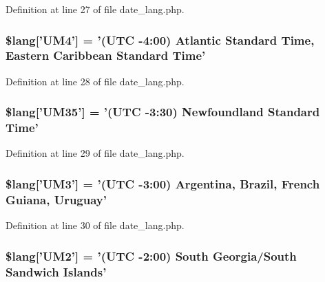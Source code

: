 Definition at line 27 of file date\-\_\-lang.\-php.

\hypertarget{date__lang_8php_a42f66872f4a082bcb2ee004bd2716828}{
\subsubsection[{\$lang}]{\setlength{\rightskip}{0pt plus 5cm}\$lang\mbox{[}'U\-M4'\mbox{]} = '(U\-T\-C -\/4\-:00) Atlantic Standard Time, Eastern Caribbean Standard Time'}}\label{date__lang_8php_a42f66872f4a082bcb2ee004bd2716828}


Definition at line 28 of file date\-\_\-lang.\-php.

\hypertarget{date__lang_8php_a389c4a60af83efd29503f60033f3071d}{
\subsubsection[{\$lang}]{\setlength{\rightskip}{0pt plus 5cm}\$lang\mbox{[}'U\-M35'\mbox{]} = '(U\-T\-C -\/3\-:30) Newfoundland Standard Time'}}\label{date__lang_8php_a389c4a60af83efd29503f60033f3071d}


Definition at line 29 of file date\-\_\-lang.\-php.

\hypertarget{date__lang_8php_abd67512895187d494bbfb18f8d8fee43}{
\subsubsection[{\$lang}]{\setlength{\rightskip}{0pt plus 5cm}\$lang\mbox{[}'U\-M3'\mbox{]} = '(U\-T\-C -\/3\-:00) Argentina, Brazil, French Guiana, Uruguay'}}\label{date__lang_8php_abd67512895187d494bbfb18f8d8fee43}


Definition at line 30 of file date\-\_\-lang.\-php.

\hypertarget{date__lang_8php_a8ee2f132b462bb709fc3402a592ff573}{
\subsubsection[{\$lang}]{\setlength{\rightskip}{0pt plus 5cm}\$lang\mbox{[}'U\-M2'\mbox{]} = '(U\-T\-C -\/2\-:00) South Georgia/South Sandwich Islands'}}\label{date__lang_8php_a8ee2f132b462bb709fc3402a592ff573}


